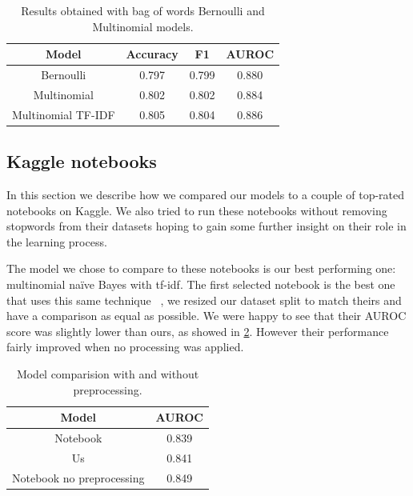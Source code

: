 \begin{table}[h!t]
    \centering
    \caption{Results obtained with bag of words Bernoulli and Multinomial models.}
    \label{tab:classic_nb_vs_embeddings}
    \begin{tabular}{c|ccc}
        \hline
        Model & Accuracy & F1 & AUROC \\
        \hline 
        Bernoulli & 0.797 & 0.799 & 0.880 \\ 
        Multinomial & 0.802 & 0.802 & 0.884 \\ 
        Multinomial TF-IDF & 0.805 & 0.804 & 0.886 \\ 
        \hline
    \end{tabular}
\end{table}

\subsection*{Kaggle notebooks}

In this section we describe how we compared our models to a couple of top-rated notebooks on Kaggle.
We also tried to run these notebooks without removing stopwords from their datasets hoping to gain some further insight on their role in the learning process. 

The model we chose to compare to these notebooks is our best performing one: multinomial na\"ive Bayes with tf-idf. 
The first selected notebook is the best one that uses this same technique ~\cite{startups:notebook1}, we resized our dataset split to match theirs and have a comparison as equal as possible.
We were happy to see that their AUROC score was slightly lower than ours, as showed in \ref{tab:versus_metrics_NB}.
However their performance fairly improved when no processing was applied.

\begin{table}[h!t]
    \centering
    \caption{Model comparision with and without preprocessing.}
    \label{tab:versus_metrics_NB}
    \begin{tabular}{c|c}
        \hline
        Model & AUROC \\
        \hline 
        Notebook & 0.839 \\ 
        Us & 0.841 \\ 
        Notebook no preprocessing & 0.849 \\ 
        \hline
    \end{tabular}
\end{table}

